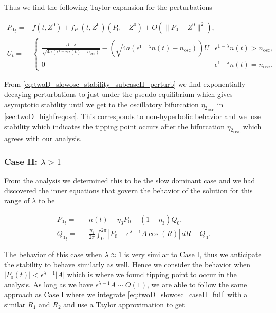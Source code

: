 Thus we find the following Taylor expansion for the perturbations

\begin{equation}\label{eq:twoD_slowosc_stability_subcaseII_perturb}
\begin{aligned}
{P_0}_t =& f(t,Z^0)+f_{P_0}(t,Z^0)(P_0-Z^0)+O(\lVert P_0-Z^0 \rVert^2),\\
 U_t = & \begin{cases}
\frac{\epsilon^{1-\lambda}}{\sqrt{4a(\epsilon^{1-\lambda}n(t)-n_{\text{osc}})}}-\left(\sqrt{4a(\epsilon^{1-\lambda}n(t)-n_{\text{osc}})}\right) U & \epsilon^{1-\lambda}n(t)>n_{\text{osc}},\\
0 & \epsilon^{1-\lambda}n(t)=n_{\text{osc}}.
\end{cases}
\end{aligned}
\end{equation}

From \eqref{eq:twoD_slowosc_stability_subcaseII_perturb} we find exponentially decaying perturbations to just under the pseudo-equilibrium which gives asymptotic stability until we get to the oscillatory bifurcation ${\eta_2}_{\text{osc}}$ in \autoref{sec:twoD_highfreqosc}. This corresponds to non-hyperbolic behavior and we lose stability which indicates the tipping point occurs after the bifurcation ${\eta_2}_{\text{osc}}$ which agrees with our analysis.

\subsubsection{Case II: $\lambda>1$}

From the analysis we determined this to be the slow dominant case and we had discovered the inner equations that govern the behavior of the solution for this range of $\lambda$ to be

\begin{equation}\label{eq:twoD_slowosc_caseII_full}
\begin{aligned}
{P_0}_t =& - n(t)-\eta_3 P_0 -(1-\eta_3)Q_0,\\
{Q_0}_t =& -\frac{\eta_1}{2\pi}\int_0^{2\pi}|P_0-\epsilon^{\lambda-1} A\cos(R)|\,dR - Q_0.
\end{aligned}
\end{equation}

The behavior of this case when $\lambda\approx 1$ is very similar to Case I, thus we anticipate the stability to behave similarly as well. Hence we consider the behavior when $|P_0(t)|<\epsilon^{\lambda-1}|A|$ which is where we found tipping point to occur in the analysis. As long as we have $\epsilon^{\lambda-1}A\sim O(1)$, we are able to follow the same approach as Case I where we integrate \eqref{eq:twoD_slowosc_caseII_full} with a similar $R_1$ and $R_2$ and use a Taylor approximation to get

